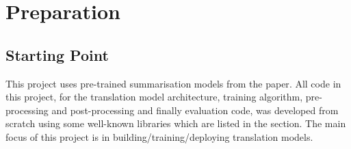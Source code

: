 \documentclass[12pt,a4paper,twoside,openright]{report}
\newcommand{\red}[1]{\textcolor{red}{#1}}
\begin{document}
\chapter{Preparation}
\label{preperation}

\section{Starting Point}
\label{starting-point}
This project uses pre-trained summarisation models from the paper\cite{summary}.
All code in this project, for the translation model architecture, training algorithm, pre-processing and post-processing and finally evaluation code, was developed from scratch using some well-known libraries which are listed in the  section.
The main focus of this project is in building/training/deploying translation models.




\end{document}
